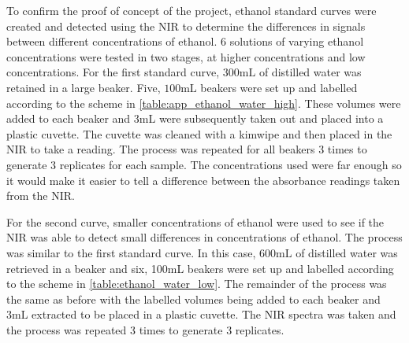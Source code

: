 \documentclass[12pt]{report}
\begin{document}
To confirm the proof of concept of the project, ethanol standard curves were created and detected using the NIR to determine the differences in signals between different concentrations of ethanol. $6$ solutions of varying ethanol concentrations were tested in two stages, at higher concentrations and low concentrations. For the first standard curve, $300\text{mL}$ of distilled water was retained in a large beaker. Five, $100\text{mL}$ beakers were set up and labelled according to the scheme in \autoref{table:app_ethanol_water_high}. These volumes were added to each beaker and 3mL were subsequently taken out and placed into a plastic cuvette. The cuvette was cleaned with a kimwipe and then placed in the NIR to take a reading. The process was repeated for all beakers 3 times to generate 3 replicates for each sample. The concentrations used were far enough so it would make it easier to tell a difference between the absorbance readings taken from the NIR.

For the second curve, smaller concentrations of ethanol were used to see if the NIR was able to detect small differences in concentrations of ethanol. The process was similar to the first standard curve. In this case, $600\text{mL}$ of distilled water was retrieved in a beaker and six, 100mL beakers were set up and labelled according to the scheme in \autoref{table:ethanol_water_low}. The remainder of the process was the same as before with the labelled volumes being added to each beaker and $3\text{mL}$ extracted to be placed in a plastic cuvette. The NIR spectra was taken and the process was repeated 3 times to generate 3 replicates. 
\end{document}
